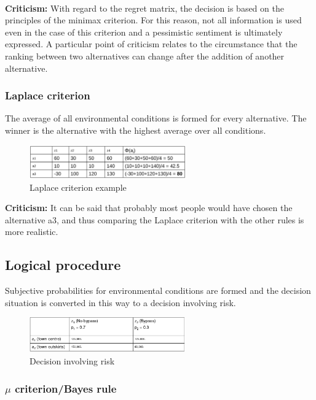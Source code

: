 \mbox{}\\
\textbf{Criticism:} With regard to the regret matrix, the decision is
based on the principles of the minimax criterion. For this reason, not
all information is used even in the case of this criterion and a
pessimistic sentiment is ultimately expressed. A particular point of
criticism relates to the circumstance that the ranking between two
alternatives can change after the addition of another alternative.


\subsubsection{Laplace criterion}

The average of all environmental conditions is formed for every
alternative. The winner is the alternative with the highest average over
all conditions.

\begin{figure}[H]
	\centering
	\includegraphics[width=0.6\textwidth]{figures/LaplaceExample.png}
	\caption{Laplace criterion example}
\end{figure}

\textbf{Criticism:} It can be said that probably most people would have
chosen the alternative a3, and thus comparing the Laplace criterion
with the other rules is more realistic.

\subsection{Logical procedure}

Subjective probabilities for environmental conditions are formed and the
decision situation is converted in this way to a decision involving
risk.

\begin{figure}[H]
\centering
\includegraphics[width=0.6\textwidth]{figures/logicalDecisionMaking.png}
\caption{Decision involving risk}
\end{figure}

\subsubsection{$\mu$ criterion/Bayes rule}

